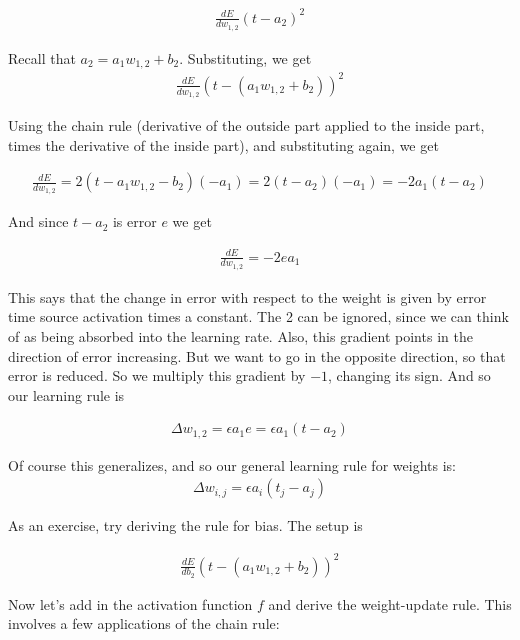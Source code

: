 \begin{eqnarray*}
\frac{dE}{dw_{1,2}} (t - a_2)^2
\end{eqnarray*}

Recall that $a_2 =  a_1 w_{1,2} + b_2$. Substituting, we get
\begin{eqnarray*}
\frac{dE}{dw_{1,2}} (t - ( a_1 w_{1,2} + b_2))^2 
\end{eqnarray*}

Using the chain rule (derivative of the outside part applied to the inside part, times the derivative of the inside part), and substituting again, we get

\begin{eqnarray*}
\frac{dE}{dw_{1,2}} = 2 (t - a_1 w_{1,2} - b_2) (-a_1) =   2 (t - a_2) (-a_1)  = -2 a_1 (t - a_2)
\end{eqnarray*}

And since $t - a_2$ is error $e$ we get

\begin{eqnarray*}
\frac{dE}{dw_{1,2}} = -2 e a_1
\end{eqnarray*}

This says that the change in error with respect to the weight is given by error time source activation times a constant. The 2 can be ignored, since we can think of as being absorbed into the learning rate. Also, this gradient points in the direction of error increasing. But we want to go in the opposite direction, so that error is reduced. So we multiply this gradient by $-1$, changing its sign. And so our learning rule is 

\begin{eqnarray*}
\Delta w_{1,2}  =  \epsilon a_1 e  = \epsilon a_1 (t - a_2)
\end{eqnarray*} 

Of course this generalizes, and so our general learning rule for weights is:
\begin{eqnarray*}
\Delta w_{i,j}  =  \epsilon a_i (t_j - a_j)
\end{eqnarray*} 

As an exercise, try deriving the rule for bias. The setup is

\begin{eqnarray*}
\frac{dE}{db_{2}} (t - ( a_1 w_{1,2} + b_2))^2 
\end{eqnarray*}

Now let's add in the activation function $f$ and derive the weight-update rule.  This involves a few applications of the chain rule:

